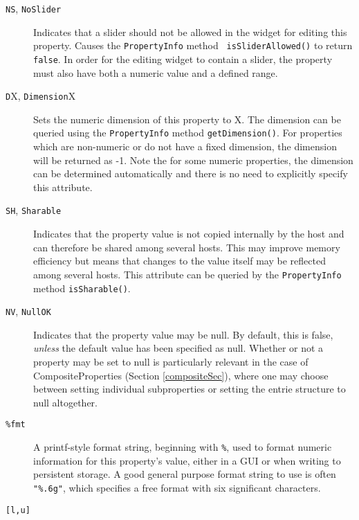 \begin{description}
\item[{\tt NS}, {\tt NoSlider}] \mbox{}

Indicates that a slider should not be allowed in the widget for
editing this property. Causes the {\tt PropertyInfo} method {\tt
isSliderAllowed()} to return {\tt false}. In order for the editing
widget to contain a slider, the property must also have both a numeric
value and a defined range.

\item[{\tt D}X, {\tt Dimension}X] \mbox{}

Sets the numeric dimension of this
property to X. The dimension can be queried using the 
{\tt PropertyInfo} method {\tt getDimension()}. For properties which are
non-numeric or do not have a fixed dimension, the dimension will be
returned as -1. Note the for some numeric properties, the dimension
can be determined automatically and there is no need to explicitly
specify this attribute.

\item[{\tt SH}, {\tt Sharable}] \mbox{}

Indicates that the property value is
not copied internally by the host and can therefore be shared among
several hosts. This may improve memory efficiency but means that
changes to the value itself may be reflected among several hosts.
This attribute can be queried by the {\tt PropertyInfo} method 
{\tt isSharable()}.

\item[{\tt NV}, {\tt NullOK}] \mbox{}

Indicates that the property value 
may be null. By default, this is false, {\it unless} the
default value has been specified as null. Whether
or not a property may be set to null is particularly
relevant in the case of CompositeProperties (Section \ref{compositeSec}),
where one may choose between setting individual subproperties or
setting the entrie structure to null altogether.

\item[{\tt \%fmt} ] \mbox{}

A printf-style format string, beginning with {\tt \%}, used to
format numeric information for this property's value, either in a GUI
or when writing to persistent storage. A good general purpose format
string to use is often {\tt "\%.6g"}, which specifies a free format with
six significant characters.

\item[{\tt [l,u]} ] \mbox{}


\end{description}

